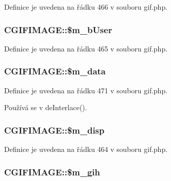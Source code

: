 Definice je uvedena na řádku 466 v souboru gif.\-php.

\hypertarget{class_c_g_i_f_i_m_a_g_e_a5ad0b927cacb411bc7086e4c3f18605b}{
\subsubsection[{\$m\-\_\-b\-User}]{\setlength{\rightskip}{0pt plus 5cm}C\-G\-I\-F\-I\-M\-A\-G\-E\-::\$m\-\_\-b\-User}}\label{class_c_g_i_f_i_m_a_g_e_a5ad0b927cacb411bc7086e4c3f18605b}


Definice je uvedena na řádku 465 v souboru gif.\-php.

\hypertarget{class_c_g_i_f_i_m_a_g_e_a098f579f8f3df13a07345c79f5a3b53b}{
\subsubsection[{\$m\-\_\-data}]{\setlength{\rightskip}{0pt plus 5cm}C\-G\-I\-F\-I\-M\-A\-G\-E\-::\$m\-\_\-data}}\label{class_c_g_i_f_i_m_a_g_e_a098f579f8f3df13a07345c79f5a3b53b}


Definice je uvedena na řádku 471 v souboru gif.\-php.



Používá se v de\-Interlace().

\hypertarget{class_c_g_i_f_i_m_a_g_e_a77a194d8175789419b1c43b14ead858b}{
\subsubsection[{\$m\-\_\-disp}]{\setlength{\rightskip}{0pt plus 5cm}C\-G\-I\-F\-I\-M\-A\-G\-E\-::\$m\-\_\-disp}}\label{class_c_g_i_f_i_m_a_g_e_a77a194d8175789419b1c43b14ead858b}


Definice je uvedena na řádku 464 v souboru gif.\-php.

\hypertarget{class_c_g_i_f_i_m_a_g_e_aba954f5e894938e2e84d3b6a4b39f2d9}{
\subsubsection[{\$m\-\_\-gih}]{\setlength{\rightskip}{0pt plus 5cm}C\-G\-I\-F\-I\-M\-A\-G\-E\-::\$m\-\_\-gih}}\label{class_c_g_i_f_i_m_a_g_e_aba954f5e894938e2e84d3b6a4b39f2d9}


